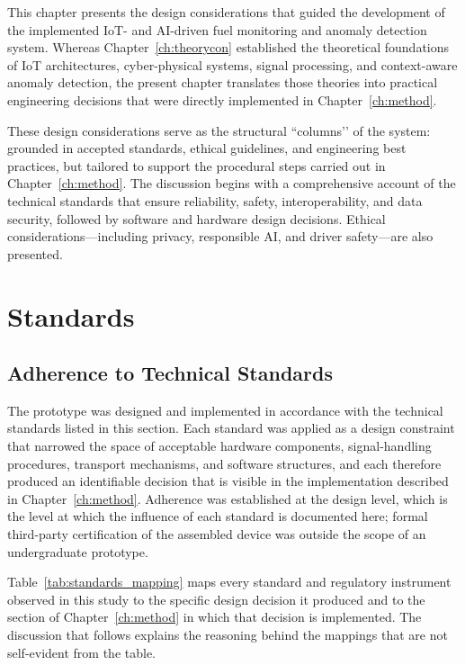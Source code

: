 This chapter presents the design considerations that guided the development of the implemented IoT- and AI-driven fuel monitoring and anomaly detection system. Whereas Chapter~\ref{ch:theorycon} established the theoretical foundations of IoT architectures, cyber-physical systems, signal processing, and context-aware anomaly detection, the present chapter translates those theories into practical engineering decisions that were directly implemented in Chapter~\ref{ch:method}. 

These design considerations serve as the structural “columns’’ of the system: grounded in accepted standards, ethical guidelines, and engineering best practices, but tailored to support the procedural steps carried out in Chapter~\ref{ch:method}. The discussion begins with a comprehensive account of the technical standards that ensure reliability, safety, interoperability, and data security, followed by software and hardware design decisions. Ethical considerations—including privacy, responsible AI, and driver safety—are also presented.

\section{Standards}
\label{sec:standards}

\subsection{Adherence to Technical Standards}

The prototype was designed and implemented in accordance with the technical standards listed in this section. Each standard was applied as a design constraint that narrowed the space of acceptable hardware components, signal-handling procedures, transport mechanisms, and software structures, and each therefore produced an identifiable decision that is visible in the implementation described in Chapter~\ref{ch:method}. Adherence was established at the design level, which is the level at which the influence of each standard is documented here; formal third-party certification of the assembled device was outside the scope of an undergraduate prototype.

Table~\ref{tab:standards_mapping} maps every standard and regulatory instrument observed in this study to the specific design decision it produced and to the section of Chapter~\ref{ch:method} in which that decision is implemented. The discussion that follows explains the reasoning behind the mappings that are not self-evident from the table.

